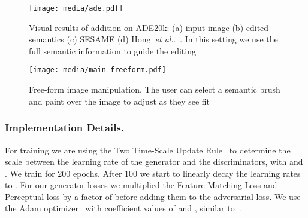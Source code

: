 \documentclass[runningheads]{llncs}
\makeatletter
\DeclareRobustCommand\onedot{\futurelet\@let@token\@onedot}
\def\@onedot{\ifx\@let@token.\else.\null\fi\xspace}
\def\etal{\emph{et al}\onedot}
\def\hong{Hong~\etal~\cite{hong2018learning}}
\makeatother
\begin{document}
\begin{figure}[t]
\begin{center}
    \centering
    \texttt{[image: media/ade.pdf]}
    \caption{Visual results of addition on ADE20k: (a) input image (b) edited semantics (c) SESAME (d) \hong{}. In this setting we use the full semantic information to guide the editing}
    \label{fig:ade_results}
\end{center}
\end{figure}

\begin{figure}[t]
\begin{center}
    \centering
    \texttt{[image: media/main-freeform.pdf]}
    \caption{Free-form image manipulation. The user can select a semantic brush and paint over the image to adjust as they see fit}
    \label{fig:freeform}
\end{center}
\end{figure}



\subsubsection{Implementation Details.}
\label{ssc:implementation_details}
For training we are using the Two Time-Scale Update Rule~\cite{NIPS2017_7240} to determine the scale between the learning rate of the generator and the discriminators, with  and .
We train for 200 epochs.
After 100 we start to linearly decay the learning rates to .
For our generator losses we multiplied the Feature Matching Loss and Perceptual loss by a factor of  before adding them to the adversarial loss. We use the Adam optimizer~\cite{adam} with coefficient values of  and , similar to~\cite{park2019SPADE}.
\end{document}
